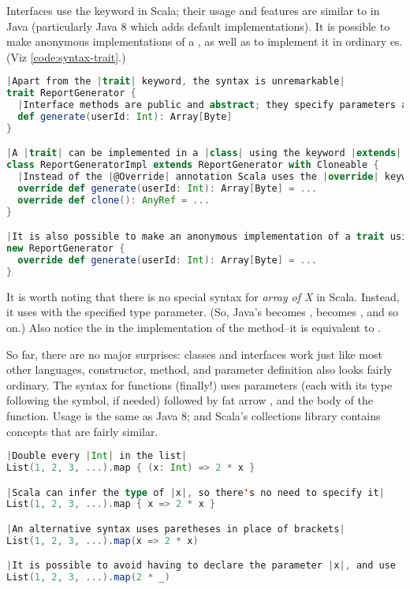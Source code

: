 \documentclass[10 pt]{article}
\begin{document}
Interfaces use the  keyword in Scala; their usage and features are similar to  in Java (particularly Java 8 which adds default implementations). It is possible to make anonymous implementations of a , as well as to implement it in ordinary es. (Viz \autoref{code:syntax-trait}.)

\begin{lstlisting}[caption={Traits}, label={code:syntax-trait}, language=Scala, escapechar=|]
|Apart from the |trait| keyword, the syntax is unremarkable|
trait ReportGenerator {
  |Interface methods are public and abstract; they specify parameters and return type|
  def generate(userId: Int): Array[Byte]
}

|A |trait| can be implemented in a |class| using the keyword |extends|. Additional traits to be implemented use the |with| keyword.|
class ReportGeneratorImpl extends ReportGenerator with Cloneable {
  |Instead of the |@Override| annotation Scala uses the |override| keyword.|
  override def generate(userId: Int): Array[Byte] = ...
  override def clone(): AnyRef = ...
}

|It is also possible to make an anonymous implementation of a trait using the |new| keyword.|
new ReportGenerator {
  override def generate(userId: Int): Array[Byte] = ...
}
\end{lstlisting}

It is worth noting that there is no special syntax for \emph{array of X} in Scala. Instead, it uses  with the specified type parameter. (So, Java's  becomes ,  becomes , and so on.) Also notice the  in the implementation of the  method--it is equivalent to .

So far, there are no major surprises: classes and interfaces work just like most other languages, constructor, method, and parameter definition also looks fairly ordinary. The syntax for functions (finally!) uses parameters (each with its type following the \pcode{:} symbol, if needed) followed by fat arrow \pcode{=>}, and the body of the function. Usage is the same as Java 8; and Scala's collections library contains concepts that are fairly similar.

\begin{lstlisting}[caption={Fields \& variables}, label={code:syntax-fun}, language=Scala, escapechar=|]
|Double every |Int| in the list|
List(1, 2, 3, ...).map { (x: Int) => 2 * x }

|Scala can infer the type of |x|, so there's no need to specify it|
List(1, 2, 3, ...).map { x => 2 * x }

|An alternative syntax uses paretheses in place of brackets|
List(1, 2, 3, ...).map(x => 2 * x)

|It is possible to avoid having to declare the parameter |x|, and use |_| instead. Scala compiler replaces the every occurrence of |_| with a fresh parameter declaration.|
List(1, 2, 3, ...).map(2 * _)
\end{lstlisting}
\end{document}
